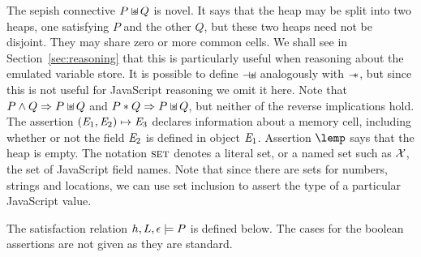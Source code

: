 \documentclass{article}
\begin{document}
The sepish  connective  $P \mathbin{\sqcup\mkern-10mu*} Q$ is novel. It says that the heap may be split into two heaps,
one satisfying $P$ and the other  $Q$, but
these two heaps need not be disjoint. They may share zero or more
common cells. We shall see in Section~\ref{sec:reasoning} that this is
particularly useful when reasoning about the emulated variable store. 
It is possible to define $\mathbin{-\mkern-4mu\mathbin{\sqcup\mkern-10mu*}}$ analogously with $\mathbin{-\mkern-6mu *}$, but
since this is not useful for JavaScript reasoning we omit it here. 
Note that $P \wedge Q \Rightarrow P \mathbin{\sqcup\mkern-10mu*} Q$ and $P \ast Q \Rightarrow P \mathbin{\sqcup\mkern-10mu*} Q$, but neither of the reverse implications hold. 
%
The assertion $({\mathit{E}}_1,{\mathit{E}}_2)\mapsto {\ensuremath{\mathit{E}}}_3$ declares information about a memory 
cell, including whether or not the field ${\mathit{E}}_2$ is defined in object ${\mathit{E}}_1$. 
Assertion $\lemp$ says that the heap is empty.
%
The notation  ${\mbox{\textsc{set}}}$ denotes  a literal set, or a named set such as $\mathcal{X}$, the
set of JavaScript field names. Note that since there are sets for
numbers, strings and locations, we can use set inclusion to assert the
type of a particular JavaScript value.
%

%


%
The satisfaction relation $h,L,{\epsilon} \models P$ is defined below. The cases for the boolean assertions are not given
as they are standard. 
\end{document}
